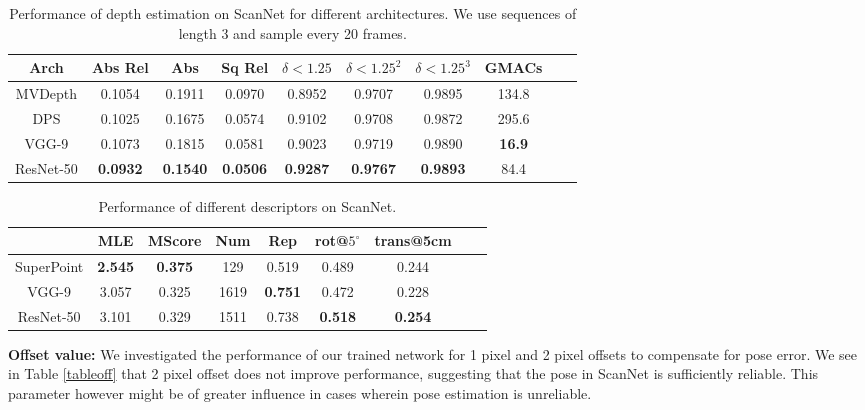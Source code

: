 \documentclass[runningheads]{llncs}
\begin{document}
\begin{table}[t]
  \caption{Performance of depth estimation on ScanNet for different architectures. We use sequences of length 3 and sample every 20 frames. }
  \centering
\begin{tabular}{cccccccccc}
 \hline 
   Arch  &Abs Rel  &Abs & Sq Rel & \textbf{$\delta< 1.25$}& \textbf{$\delta < 1.25^2$}& \textbf{$\delta< 1.25^3$} & GMACs\\
    \hline
MVDepth & 0.1054 & 0.1911 & 0.0970 & 0.8952 & 0.9707 & 0.9895 & 134.8  \\
DPS &	0.1025 & 0.1675 & 0.0574 &  0.9102 & 0.9708 & 0.9872 & 295.6	\\
VGG-9&0.1073&	0.1815&	0.0581&	0.9023&	0.9719&	0.9890 & \textbf{16.9} \\
ResNet-50 &	\textbf{0.0932} & \textbf{0.1540} & \textbf{0.0506} &  \textbf{0.9287} & \textbf{0.9767} & \textbf{0.9893} & 84.4 \\
\hline
  \end{tabular}
\label{tablearch}
\end{table}


\begin{table}
  \caption{Performance of different descriptors on ScanNet.}
  \centering
\begin{tabular}{ccccccccc}
  \hline
&\textbf{MLE}  &\textbf{MScore} & \textbf{Num} & \textbf{Rep}& \textbf{rot@$5^{\circ}$}& \textbf{trans@5cm}\\

    \hline
SuperPoint  &  \textbf{2.545} &     \textbf{0.375}  &   129  & 0.519	&  0.489 &      0.244 \\
VGG-9 &	3.057 &		0.325  &   1619  & \textbf{0.751} &  0.472 &		0.228	\\
ResNet-50 &	 3.101 &   0.329   &  1511  & 0.738 &  \textbf{0.518} &\textbf{0.254} 	\\
\hline
  \end{tabular}
  \label{tabledd}
\end{table}

\vspace{4mm}
\noindent
\textbf{Offset value:} We investigated the performance of our trained network for 1 pixel and 2 pixel offsets to compensate for pose error. We see in Table \ref{tableoff} that 2 pixel offset does not improve performance, suggesting that the pose in ScanNet is sufficiently reliable. This parameter however might be of greater influence in cases wherein pose estimation is unreliable.
\end{document}
